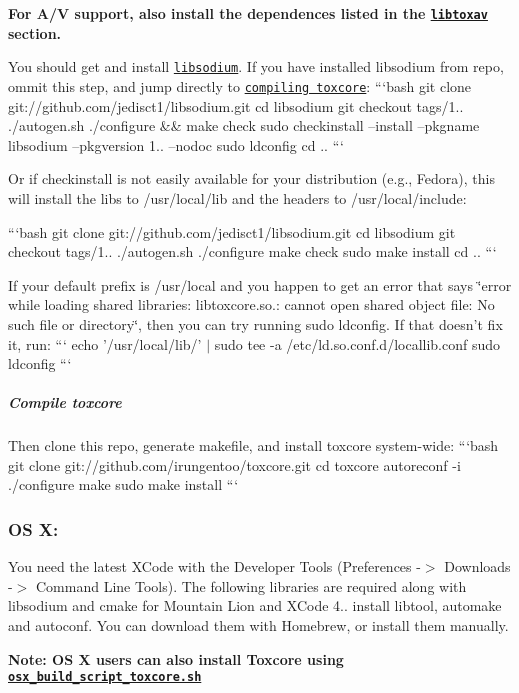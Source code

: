 {\bfseries For A/\+V support, also install the dependences listed in the \href{#libtoxav}{\tt libtoxav} section.}

You should get and install \href{https://github.com/jedisct1/libsodium}{\tt libsodium}. If you have installed {\ttfamily libsodium} from repo, ommit this step, and jump directly to \href{#compile-toxcore}{\tt compiling toxcore}\+: ```bash git clone git\+://github.com/jedisct1/libsodium.\+git cd libsodium git checkout tags/1.. ./autogen.sh ./configure \&\& make check sudo checkinstall --install --pkgname libsodium --pkgversion 1.. --nodoc sudo ldconfig cd .. ```

Or if checkinstall is not easily available for your distribution (e.\+g., Fedora), this will install the libs to /usr/local/lib and the headers to /usr/local/include\+:

```bash git clone git\+://github.com/jedisct1/libsodium.\+git cd libsodium git checkout tags/1.. ./autogen.sh ./configure make check sudo make install cd .. ```

If your default prefix is /usr/local and you happen to get an error that says \char`\"{}error while loading shared libraries\+: libtoxcore.\+so.\+: cannot open shared object file\+: No such file or directory\char`\"{}, then you can try running {\ttfamily sudo ldconfig}. If that doesn't fix it, run\+: ``` echo '/usr/local/lib/' $\vert$ sudo tee -\/a /etc/ld.so.\+conf.\+d/locallib.conf sudo ldconfig ```

\subparagraph*{Compile toxcore}

Then clone this repo, generate makefile, and install {\ttfamily toxcore} system-\/wide\+: ```bash git clone git\+://github.com/irungentoo/toxcore.\+git cd toxcore autoreconf -\/i ./configure make sudo make install ```

\label{_osx}%
 \subsubsection*{O\+S X\+:}

You need the latest X\+Code with the Developer Tools (Preferences -\/$>$ Downloads -\/$>$ Command Line Tools). The following libraries are required along with libsodium and cmake for Mountain Lion and X\+Code 4.. install libtool, automake and autoconf. You can download them with Homebrew, or install them manually.

{\bfseries Note\+: O\+S X users can also install Toxcore using \href{other/osx_build_script_toxcore.sh}{\tt osx\+\_\+build\+\_\+script\+\_\+toxcore.\+sh}}

